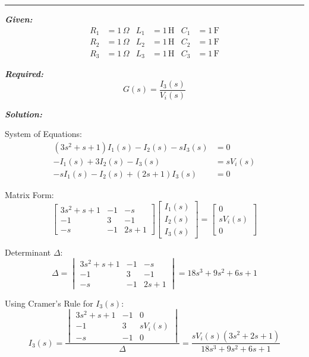 ﻿\documentclass[11pt]{article}
\begin{document}
\noindent\rule{\textwidth}{1pt}

\vspace{12pt}

\noindent\textbf{\textit{Given:}}
\[
\begin{aligned}
R_1 &= 1\, \Omega & L_1 &= 1\, \text{H} & C_1 &= 1\, \text{F} \\
R_2 &= 1\, \Omega & L_2 &= 1\, \text{H} & C_2 &= 1\, \text{F} \\
R_3 &= 1\, \Omega & L_3 &= 1\, \text{H} & C_3 &= 1\, \text{F}
\end{aligned}
\]

\vspace{12pt}

\noindent \textbf{\textit{Required:}}
\[
G(s) = \frac{I_3(s)}{V_i(s)}
\]

\vspace{12pt}

\noindent \textbf{\textit{Solution:}}

\bigskip

{System of Equations:}
\[
\begin{aligned}
(3s^2 + s + 1)I_1(s) - I_2(s) - s I_3(s) &= 0 \\
-I_1(s) + 3I_2(s) - I_3(s) &= sV_i(s) \\
-s I_1(s) - I_2(s) + (2s + 1)I_3(s) &= 0
\end{aligned}
\]

{Matrix Form:}
\[
\begin{bmatrix}
3s^2 + s + 1 & -1 & -s \\
-1 & 3 & -1 \\
-s & -1 & 2s + 1
\end{bmatrix}
\begin{bmatrix}
I_1(s) \\ I_2(s) \\ I_3(s)
\end{bmatrix}
=
\begin{bmatrix}
0 \\ sV_i(s) \\ 0
\end{bmatrix}
\]

{Determinant \(\Delta\):}
\[
\Delta =
\begin{vmatrix}
3s^2 + s + 1 & -1 & -s \\
-1 & 3 & -1 \\
-s & -1 & 2s + 1
\end{vmatrix}
= 18s^3 + 9s^2 + 6s + 1
\]

{Using Cramer's Rule for \(I_3(s)\):}
\[
I_3(s) =
\frac{
\begin{vmatrix}
3s^2 + s + 1 & -1 & 0 \\
-1 & 3 & sV_i(s) \\
-s & -1 & 0
\end{vmatrix}
}
{\Delta}
= \frac{sV_i(s)(3s^2 + 2s + 1)}{18s^3 + 9s^2 + 6s + 1}
\]
\end{document}
